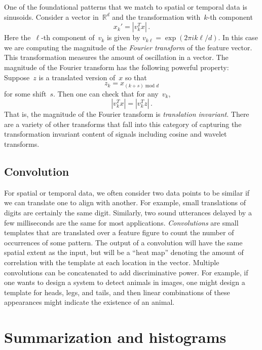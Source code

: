 \documentclass{tufte-book}
\begin{document}
One of the foundational patterns that we match to spatial or temporal
data is sinusoids. Consider a vector in~\(\mathbb{R}^d\) and the
transformation with~\(k\)-th component \[
    x_k' = |v_k^T x| \,.
\] Here the~\(\ell\)-th component of~\(v_k\) is given by
\(v_{k\ell} = \exp(2\pi i k \ell/d)\). In this case we are computing the
magnitude of the \emph{Fourier transform} of the feature vector. This
transformation measures the amount of oscillation in a vector. The
magnitude of the Fourier transform has the following powerful property:
Suppose~\(z\) is a translated version of~\(x\) so that \[
    z_k = x_{(k + s) \operatorname{mod} d}
\] for some shift~\(s\). Then one can check that for any~\(v_k\), \[
    |v_k^T x|  = |v_k^T z| \,.
\] That is, the magnitude of the Fourier transform is \emph{translation
invariant}. There are a variety of other transforms that fall into this
category of capturing the transformation invariant content of signals
including cosine and wavelet transforms.

\hypertarget{convolution}{%
\subsection{Convolution}\label{convolution}}


For spatial or temporal data, we often consider two data points to be
similar if we can translate one to align with another. For example,
small translations of digits are certainly the same digit. Similarly,
two sound utterances delayed by a few milliseconds are the same for most
applications. \emph{Convolutions} are small templates that are
translated over a feature figure to count the number of occurrences of
some pattern. The output of a convolution will have the same spatial
extent as the input, but will be a ``heat map'' denoting the amount of
correlation with the template at each location in the vector. Multiple
convolutions can be concatenated to add discriminative power. For
example, if one wants to design a system to detect animals in images,
one might design a template for heads, legs, and tails, and then linear
combinations of these appearances might indicate the existence of an
animal.

\hypertarget{summarization-and-histograms}{%
\section{Summarization and
histograms}\label{summarization-and-histograms}}
\end{document}
